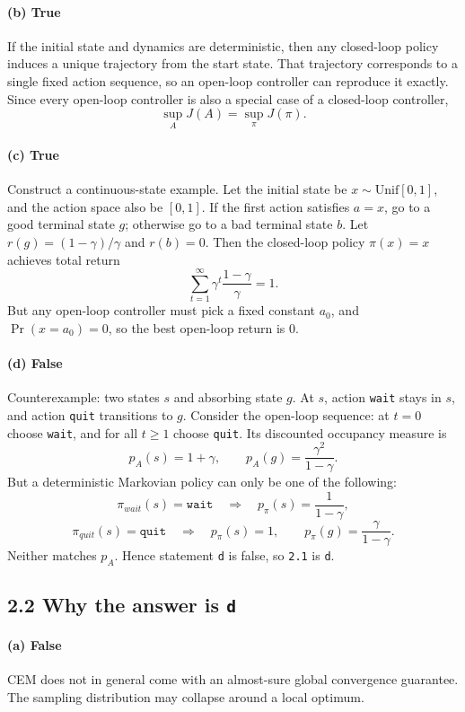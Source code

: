 \documentclass[11pt]{article}
\newcommand{\1}{\mathbf{1}}
\begin{document}
\paragraph{(b) True}
If the initial state and dynamics are deterministic, then any closed-loop policy induces a unique trajectory from the start state. That trajectory corresponds to a single fixed action sequence, so an open-loop controller can reproduce it exactly. Since every open-loop controller is also a special case of a closed-loop controller,
\[
\sup_A J(A)=\sup_\pi J(\pi).
\]

\paragraph{(c) True}
Construct a continuous-state example. Let the initial state be $x\sim \mathrm{Unif}[0,1]$, and the action space also be $[0,1]$. If the first action satisfies $a=x$, go to a good terminal state $g$; otherwise go to a bad terminal state $b$. Let $r(g)=(1-\gamma)/\gamma$ and $r(b)=0$. Then the closed-loop policy $\pi(x)=x$ achieves total return
\[
\sum_{t=1}^\infty \gamma^t \frac{1-\gamma}{\gamma}=1.
\]
But any open-loop controller must pick a fixed constant $a_0$, and $\Pr(x=a_0)=0$, so the best open-loop return is 0.

\paragraph{(d) False}
Counterexample: two states $s$ and absorbing state $g$. At $s$, action \texttt{wait} stays in $s$, and action \texttt{quit} transitions to $g$. Consider the open-loop sequence: at $t=0$ choose \texttt{wait}, and for all $t\ge 1$ choose \texttt{quit}. Its discounted occupancy measure is
\[
p_A(s)=1+\gamma,\qquad p_A(g)=\frac{\gamma^2}{1-\gamma}.
\]
But a deterministic Markovian policy can only be one of the following:
\[
\pi_{wait}(s)=\texttt{wait}
\quad\Rightarrow\quad
p_\pi(s)=\frac{1}{1-\gamma},
\]
\[
\pi_{quit}(s)=\texttt{quit}
\quad\Rightarrow\quad
p_\pi(s)=1,\qquad p_\pi(g)=\frac{\gamma}{1-\gamma}.
\]
Neither matches $p_A$. Hence statement \texttt{d} is false, so \texttt{2.1} is \texttt{d}.

\subsection*{2.2 Why the answer is \texttt{d}}
\paragraph{(a) False}
CEM does not in general come with an almost-sure global convergence guarantee. The sampling distribution may collapse around a local optimum.
\end{document}
